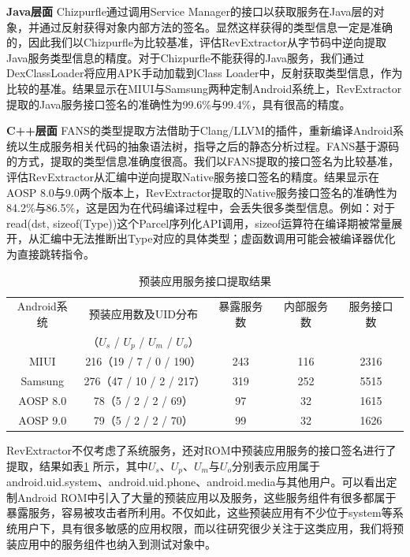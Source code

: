 \documentclass[winfonts,master,twoside]{njuthesis}
\begin{document}
\textbf{Java层面} \quad Chizpurfle通过调用Service Manager的接口以获取服务在Java层的对象，并通过反射获得对象内部方法的签名。显然这样获得的类型信息一定是准确的，因此我们以Chizpurfle为比较基准，评估RevExtractor从字节码中逆向提取Java服务类型信息的精度。对于Chizpurfle不能获得的Java服务，我们通过DexClassLoader将应用APK手动加载到Class Loader中，反射获取类型信息，作为比较的基准。结果显示在MIUI与Samsung两种定制Android系统上，RevExtractor提取的Java服务接口签名的准确性为99.6\%与99.4\%，具有很高的精度。

\textbf{C++层面} \quad FANS的类型提取方法借助于Clang/LLVM的插件，重新编译Android系统以生成服务相关代码的抽象语法树，指导之后的静态分析过程。FANS基于源码的方式，提取的类型信息准确度很高。我们以FANS提取的接口签名为比较基准，评估RevExtractor从汇编中逆向提取Native服务接口签名的精度。结果显示在AOSP 8.0与9.0两个版本上，RevExtractor提取的Native服务接口签名的准确性为84.2\%与86.5\%，这是因为在代码编译过程中，会丢失很多类型信息。例如：对于read(dst, sizeof(Type))这个Parcel序列化API调用，sizeof运算符在编译期被常量展开，从汇编中无法推断出Type对应的具体类型；虚函数调用可能会被编译器优化为直接跳转指令。

\begin{table}[!htbp]
	\centering
	\begin{tabular}{ccccc}
		\toprule{}
		Android系统 & 预装应用数及UID分布 & 暴露服务数 & 内部服务数 & 服务接口数 \\
		           & （$U_s$ / $U_p$ / $U_m$ / $U_o$） &&& \\
		\midrule
		MIUI            & 216（19 / 7 / 0 / 190）& 243 & 116 & 2316 \\
		Samsung         & 276（47 / 10 / 2 / 217）& 319 & 252 & 5515 \\
		AOSP 8.0        & 78（5 / 2 / 2 / 69）& 97  & 32  & 1615 \\
		AOSP 9.0        & 79（5 / 2 / 2 / 70）& 99  & 32  & 1626 \\
		\bottomrule
	\end{tabular}
	\caption{预装应用服务接口提取结果}
	\label{tbl:extractor_preinstall_apps}
\end{table}

RevExtractor不仅考虑了系统服务，还对ROM中预装应用服务的接口签名进行了提取，结果如表\ref{tbl:extractor_preinstall_apps} 所示，其中$U_s$、$U_p$、$U_m$与$U_o$分别表示应用属于android.uid.system、android.uid.phone、android.media与其他用户。可以看出定制Android ROM中引入了大量的预装应用以及服务，这些服务组件有很多都属于暴露服务，容易被攻击者所利用。不仅如此，这些预装应用有不少位于system等系统用户下，具有很多敏感的应用权限，而以往研究很少关注于这类应用，我们将预装应用中的服务组件也纳入到测试对象中。
\end{document}
